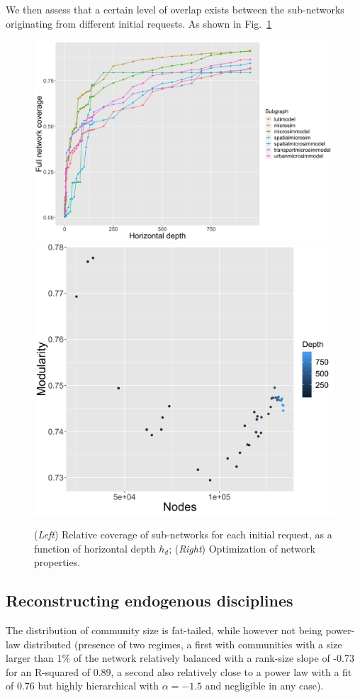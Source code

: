 We then assess that a certain level of overlap exists between the sub-networks originating from different initial requests. As shown in Fig.~\ref{fig:coverage-hdepth}

\begin{figure}
    \centering
    \includegraphics[width=0.52\linewidth]{figures/coveragesubnws.png}
    \includegraphics[width=0.38\linewidth]{figures/pareto_vcount-modularity.png}
    \caption{(\textit{Left}) Relative coverage of sub-networks for each initial request, as a function of horizontal depth $h_d$; (\textit{Right}) Optimization of network properties.}
    \label{fig:coverage-hdepth}
\end{figure}




\subsection*{Reconstructing endogenous disciplines}


The distribution of community size is fat-tailed, while however not being power-law distributed (presence of two regimes, a first with communities with a size larger than 1\% of the network relatively balanced with a rank-size slope of -0.73 for an R-squared of 0.89, a second also relatively close to a power law with a fit of 0.76 but highly hierarchical with $\alpha = -1.5$ and negligible in any case).



